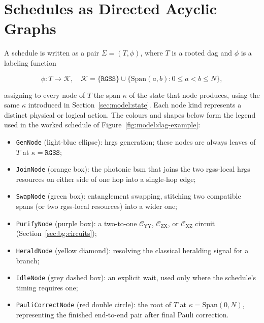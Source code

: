 \vspace{0.8cm}

\section{Schedules as Directed Acyclic Graphs}
\label{sec:model:dag}



\vspace{0.5cm}

A schedule is written as a pair $\Sigma = (T, \phi)$, where $T$ is a rooted \Gls{dag} and $\phi$ is a labeling function

\[
\phi: T \to \mathcal{K}, \quad \mathcal{K} = \{\mathtt{RGSS}\} \cup \{\mathrm{Span}(a,b) : 0 \le a < b \le N\},
\]

assigning to every node of $T$ the span $\kappa$ of the state that node produces, using the same $\kappa$ introduced in Section~\ref{sec:model:state}. Each node kind represents a distinct physical or logical action. The colours and shapes below form the legend used in the worked schedule of Figure~\ref{fig:model:dag-example}:

\clearpage

\begin{itemize}
    \item {}\enspace\texttt{GenNode} (light-blue ellipse): \Gls{hrgs} generation; these nodes are always leaves of $T$ at $\kappa=\mathtt{RGSS}$;
    \item {}\enspace\texttt{JoinNode} (orange box): the photonic \Gls{bsm} that joins the two \Gls{rgss}-local \Gls{hrgs} resources on either side of one hop into a single-hop edge;
    \item {}\enspace\texttt{SwapNode} (green box): entanglement swapping, stitching two compatible spans (or two \Gls{rgss}-local resources) into a wider one;
    \item {}\enspace\texttt{PurifyNode} (purple box): a two-to-one $\mathcal C_\mathrm{YY}$, $\mathcal C_\mathrm{ZX}$, or $\mathcal C_\mathrm{XZ}$ circuit (Section~\ref{sec:bg:circuits});
    \item {}\enspace\texttt{HeraldNode} (yellow diamond): resolving the classical heralding signal for a branch;
    \item {}\enspace\texttt{IdleNode} (grey dashed box): an explicit wait, used only where the schedule's timing requires one;
    \item {}\enspace\texttt{PauliCorrectNode} (red double circle): the root of $T$ at $\kappa=\mathrm{Span}(0,N)$, representing the finished end-to-end pair after final Pauli correction.
\end{itemize}


